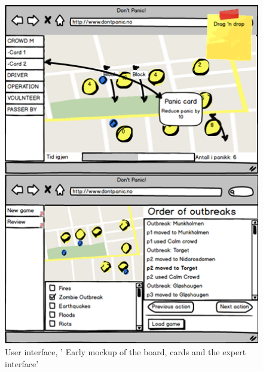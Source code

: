 \begin{figure}[H]
  \centering
    \includegraphics[width=1.0\textwidth]{img/mockups.png}
  \caption{User interface, ' Early mockup of the board, cards and the expert interface'} 
  \label{fig:mockups}
\end{figure}

